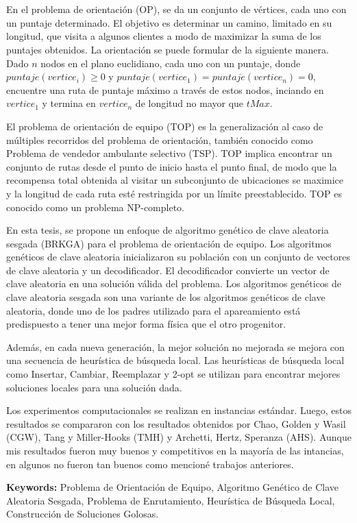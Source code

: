 
\chapter*{\tituloAbstractEs}

\noindent En el problema de orientación (OP), se da un conjunto de vértices, cada uno con un puntaje determinado. El objetivo es determinar un camino, limitado en su longitud, que visita a algunos clientes a modo de maximizar la suma de los puntajes obtenidos. La orientación se puede formular de la siguiente manera. Dado $n$ nodos en el plano euclidiano, cada uno con un puntaje, donde $puntaje(vertice_i) \geq 0$ y $puntaje(vertice_1) = puntaje(vertice_n) = 0$, encuentre una ruta de puntaje máximo a través de estos nodos, inciando en $vertice_1$ y termina en $vertice_n$ de longitud no mayor que $tMax$.

\bigskip

El problema de orientación de equipo (TOP) es la generalización al caso de múltiples recorridos del problema de orientación, también conocido como Problema de vendedor ambulante selectivo (TSP). TOP implica encontrar un conjunto de rutas desde el punto de inicio hasta el punto final, de modo que la recompensa total obtenida al visitar un subconjunto de ubicaciones se maximice y la longitud de cada ruta esté restringida por un límite preestablecido. TOP es conocido como un problema NP-completo.

\bigskip

En esta tesis, se propone un enfoque de algoritmo genético de clave aleatoria sesgada (BRKGA) para el problema de orientación de equipo. Los algoritmos genéticos de clave aleatoria inicializaron su población con un conjunto de vectores de clave aleatoria y un decodificador. El decodificador convierte un vector de clave aleatoria en una solución válida del problema. Los algoritmos genéticos de clave aleatoria sesgada son una variante de los algoritmos genéticos de clave aleatoria, donde uno de los padres utilizado para el apareamiento está predispuesto a tener una mejor forma física que el otro progenitor.

\bigskip

Además, en cada nueva generación, la mejor solución no mejorada se mejora con una secuencia de heurística de búsqueda local. Las heurísticas de búsqueda local como Insertar, Cambiar, Reemplazar y 2-opt se utilizan para encontrar mejores soluciones locales para una solución dada.

\bigskip

Los experimentos computacionales se realizan en instancias estándar. Luego, estos resultados se compararon con los resultados obtenidos por Chao, Golden y Wasil (CGW), Tang y Miller-Hooks (TMH) y Archetti, Hertz, Speranza (AHS). Aunque mis resultados fueron muy buenos y competitivos en la mayoría de las intancias, en algunos no fueron tan buenos como mencioné trabajos anteriores.

\bigskip

\noindent\textbf{Keywords:} Problema de Orientación de Equipo, Algoritmo Genético de Clave Aleatoria Sesgada, Problema de Enrutamiento, Heurística de Búsqueda Local, Construcción de Soluciones Golosas.